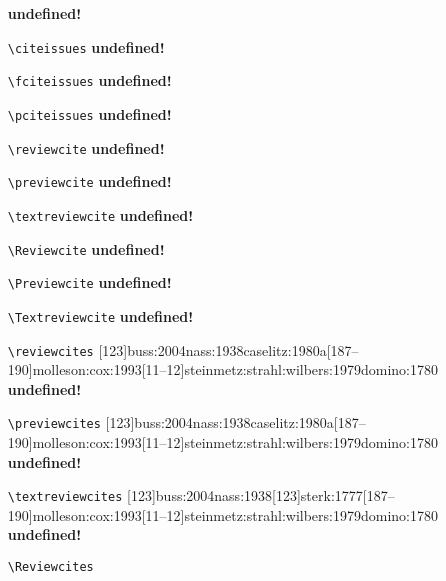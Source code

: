\documentclass[a4paper,12pt]{scrartcl}
\newcommand*{\Befehl}[1]{\texttt{\textbackslash#1}}
\begin{document}
\begin{enumerate}
        {\textbf{undefined!}}%
	\item[\footnotesize\Befehl{citeissues}] 
        {}
        {\textbf{undefined!}}%
	\item[\footnotesize\Befehl{fciteissues}] 
        {}
        {\textbf{undefined!}}%
	\item[\footnotesize\Befehl{pciteissues}] 
        {}
        {\textbf{undefined!}}%
	\item[\footnotesize\Befehl{reviewcite}] 
        {}
        {\textbf{undefined!}}%
	\item[\footnotesize\Befehl{previewcite}] 
        {}
        {\textbf{undefined!}}%
	\item[\footnotesize\Befehl{textreviewcite}] 
        {}
        {\textbf{undefined!}}%
	\item[\footnotesize\Befehl{Reviewcite}] 
        {}
        {\textbf{undefined!}}%
	\item[\footnotesize\Befehl{Previewcite}] 
        {}
        {\textbf{undefined!}}%
	\item[\footnotesize\Befehl{Textreviewcite}] 
        {}
        {\textbf{undefined!}}%
	\item[\footnotesize\Befehl{reviewcites}] 
        {[123]{buss:2004}{nass:1938}{caselitz:1980a}[187--190]{molleson:cox:1993}[11--12]{steinmetz:strahl:wilbers:1979}{domino:1780}}
        {\textbf{undefined!}}%
	\item[\footnotesize\Befehl{previewcites}] 
        {[123]{buss:2004}{nass:1938}{caselitz:1980a}[187--190]{molleson:cox:1993}[11--12]{steinmetz:strahl:wilbers:1979}{domino:1780}}
        {\textbf{undefined!}}%
	\item[\footnotesize\Befehl{textreviewcites}] 
        {[123]{buss:2004}{nass:1938}[123]{sterk:1777}[187--190]{molleson:cox:1993}[11--12]{steinmetz:strahl:wilbers:1979}{domino:1780}}
        {\textbf{undefined!}}%
	\item[\footnotesize\Befehl{Reviewcites}] 

\end{enumerate}
\end{document}
